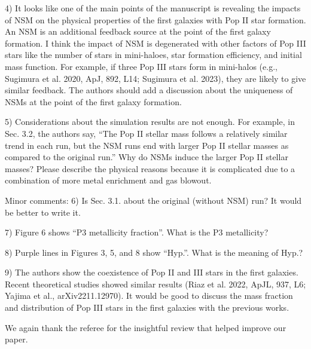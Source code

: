 \documentclass[11pt]{article}
\begin{document}
\begin{tcolorbox}[colback={lightgray}]
    4)      It looks like one of the main points of the manuscript is revealing the impacts of NSM on the physical properties of the first galaxies with Pop II star formation. An NSM is an additional feedback source at the point of the first galaxy formation. I think the impact of NSM is degenerated with other factors of Pop III stars like the number of stars in mini-haloes, star formation efficiency, and initial mass function. For example, if three Pop III stars form in mini-halos (e.g., Sugimura et al. 2020, ApJ, 892, L14; Sugimura et al. 2023), they are likely to give similar feedback. The authors should add a discussion about the uniqueness of NSMs at the point of the first galaxy formation.
\end{tcolorbox}

\begin{tcolorbox}[colback={lightgray}] 
    5)      Considerations about the simulation results are not enough. For example, in Sec. 3.2, the authors say, “The Pop II stellar mass follows a relatively similar trend in each run, but the NSM runs end with larger Pop II stellar masses as compared to the original run.” Why do NSMs induce the larger Pop II stellar masses? Please describe the physical reasons because it is complicated due to a combination of more metal enrichment and gas blowout.
\end{tcolorbox}

\begin{tcolorbox}[colback={lightgray}]
    Minor comments:
    6)      Is Sec. 3.1. about the original (without NSM) run? It would be better to write it.
\end{tcolorbox}

\begin{tcolorbox}[colback={lightgray}]
    7)      Figure 6 shows “P3 metallicity fraction”. What is the P3 metallicity?
\end{tcolorbox}

\begin{tcolorbox}[colback={lightgray}]
    8)      Purple lines in Figures 3, 5, and 8 show “Hyp.”. What is the meaning of Hyp.?
\end{tcolorbox}

\begin{tcolorbox}[colback={lightgray}]
    9)      The authors show the coexistence of Pop II and III stars in the first galaxies. Recent theoretical studies showed similar results (Riaz et al. 2022, ApJL, 937, L6; Yajima et al., arXiv2211.12970). It would be good to discuss the mass fraction and distribution of Pop III stars in the first galaxies with the previous works. 
\end{tcolorbox}

We again thank the referee for the insightful review that helped
improve our paper.
\end{document}
